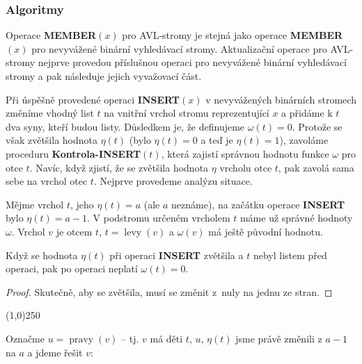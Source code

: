 \documentclass[a4paper,12pt]{article}
\newenvironment{myproof}{
  \begin{proof}
    
  }{
  \end{proof}
  \begin{center}
   \line(1,0){250}
   \end{center}
  }
\DeclareMathOperator*{\levy}{levy}
\DeclareMathOperator*{\pravy}{pravy}
\begin{document}
\subsubsection{Algoritmy}
Operace {\bf MEMBER$(x)$} pro AVL-stromy je stejná jako 
ope\-race {\bf MEMBER$(x)$} pro ne\-vy\-vá\-že\-né binární vyhledávací 
stro\-my. Aktualizační operace pro AVL-stromy nejprve provedou 
příslušnou ope\-raci pro nevyvážené binární vyhledávací stromy 
a pak násle\-du\-je jejich vyvažovací část. 

Při úspěšně 
provedené operaci {\bf IN\-SERT$(x)$} v nevyvážených binárních 
stromech změníme vhod\-ný list $t$ na vnitřní vrchol 
stromu reprezentující $x$ a přidáme k $t$ dva syny, kteří 
budou listy. Důsledkem je, že definujeme 
$\omega (t)=0$. Protože se však zvětšila hodnota $\eta 
(t)$ (bylo 
$\eta (t)=0$ a teď je $\eta (t)=1$), zavoláme proceduru 
{\bf Kontrola-INSERT$(t)$}, která zajistí správnou hodnotu 
funkce $\omega$ pro otce $t$. Navíc, když zjistí, že se zvětšila 
hodnota $\eta$ vrcholu otce $t$, pak zavolá sama sebe na vrchol 
otec $t$. Nejprve provedeme analýzu situace. 

Mějme vrchol $t$, jeho $\eta (t)=a$ (ale $a$ neznáme), na 
začátku 
ope\-ra\-ce {\bf INSERT} bylo $\eta (t)=a-1$.  V podstromu určeném 
vrcholem $t$ máme už správné hodnoty $\omega$.  Vrchol $
v$ je otcem $t$, 
$t=\levy(v)$ a $\omega (v)$ má ještě původní hodnotu.  

\begin{lemma}Když se hodnota $\eta (t)$ při operaci {\bf INSERT }
zvětšila a $t$ nebyl listem před operaci, pak po operaci 
neplatí $\omega (t)=0$.
\end{lemma}
\begin{myproof}
    Skutečně, aby se zvětšila, musí se změnit z~nuly na jednu ze stran.
\end{myproof}

Označme $u=\pravy(v)$ -- tj. $v$ má děti $t$, $u$, $\eta (t)$ jsme právě změnili z $a-1$ na $a$ a jdeme řešit $v$:
\end{document}
